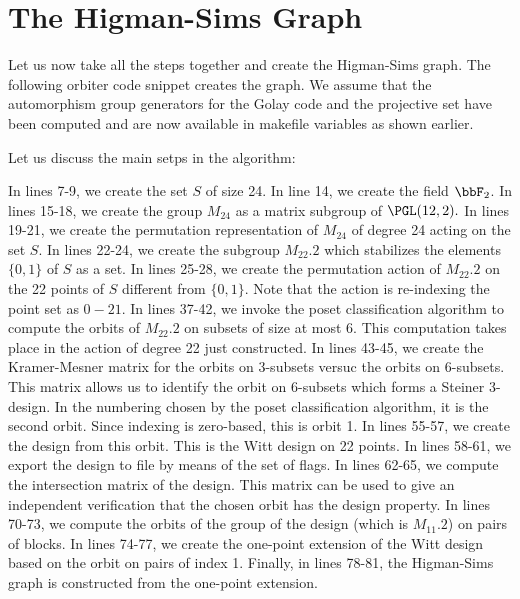 \documentclass[10pt]{article}
\begin{document}
\bigskip



\section{The Higman-Sims Graph}


Let us now take all the steps together and create the Higman-Sims graph.
The following orbiter code snippet creates the graph. 
We assume that the automorphism group generators for the Golay code and the projective set have been computed and are now available in makefile variables as shown earlier.

\bigskip


\bigskip

Let us discuss the main setps in the algorithm:

\bigskip

In lines 7-9, we create the set $S$ of size 24. In line 14, we create the field $\bbF_2$. 
In lines 15-18, we create the group $M_{24}$ as a matrix subgroup of $\PGL(12,2).$
In lines 19-21, we create the permutation representation of $M_{24}$ of degree 24 
acting on the set $S$.
In lines 22-24, we create the subgroup $M_{22}.2$ 
which stabilizes the elements $\{0,1\}$ of $S$ as a set. 
In lines 25-28, we create the permutation action of $M_{22}.2$ 
on the 22 points of $S$ 
different from $\{0,1\}$. 
Note that the action is re-indexing the point set as $0-21.$
In lines 37-42, we invoke the poset classification algorithm 
to compute the orbits of $M_{22}.2$ 
on subsets of size at most 6. 
This computation takes place in the action of degree 22 just constructed. 
In lines 43-45, we create the Kramer-Mesner matrix for the orbits on $3$-subsets versuc the orbits on $6$-subsets. 
This matrix allows us to identify the orbit on $6$-subsets which forms 
a Steiner 3-design. 
In the numbering chosen by the poset classification algorithm, 
it is the second orbit. 
Since indexing is zero-based, this is orbit 1.
In lines 55-57, we create the design from this orbit.
This is the Witt design on 22 points. 
In lines 58-61, we export the design to file by means of the set of flags. 
In lines 62-65, we compute the intersection matrix of the design. 
This matrix can be used to give an independent verification that the chosen orbit has the design property. 
In lines 70-73, we compute the orbits of the group of the design (which is $M_{11}.2$) 
on pairs of blocks. 
In lines 74-77, we create the one-point extension of the Witt design based on the orbit on pairs of index 1. 
Finally, in lines 78-81, the Higman-Sims graph is constructed from the one-point extension. 
\end{document}
